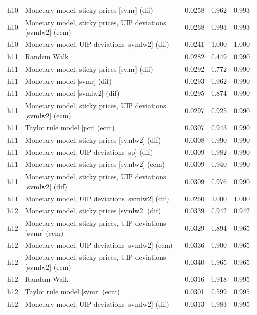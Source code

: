 \begin{ThreePartTable}
\begin{longtable}[t]{cp{5.5cm}ccc}
h10 & \raggedright Monetary model, sticky prices [svmr] (dif) & 0.0258 & 0.962 & 0.993\\
h10 & \raggedright Monetary model, sticky prices, UIP deviations [svmlw2] (ecm) & 0.0268 & 0.993 & 0.993\\
h10 & \raggedright Monetary model, UIP deviations [svmlw2] (dif) & 0.0241 & 1.000 & 1.000\\
\addlinespace
h11 & \raggedright Random Walk & 0.0282 & 0.449 & 0.990\\
h11 & \raggedright Monetary model, sticky prices [svmr] (dif) & 0.0292 & 0.772 & 0.990\\
h11 & \raggedright Monetary model [svmr] (dif) & 0.0293 & 0.962 & 0.990\\
h11 & \raggedright Monetary model [svmlw2] (dif) & 0.0295 & 0.874 & 0.990\\
h11 & \raggedright Monetary model, sticky prices, UIP deviations [svmlw2] (ecm) & 0.0297 & 0.925 & 0.990\\
h11 & \raggedright Taylor rule model [pcr] (ecm) & 0.0307 & 0.943 & 0.990\\
h11 & \raggedright Monetary model, sticky prices [svmlw2] (dif) & 0.0308 & 0.990 & 0.990\\
h11 & \raggedright Monetary model, UIP deviations [sp] (dif) & 0.0309 & 0.982 & 0.990\\
h11 & \raggedright Monetary model, sticky prices [svmlw2] (ecm) & 0.0309 & 0.940 & 0.990\\
h11 & \raggedright Monetary model, sticky prices, UIP deviations [svmlw2] (dif) & 0.0309 & 0.976 & 0.990\\
h11 & \raggedright Monetary model, UIP deviations [svmlw2] (dif) & 0.0260 & 1.000 & 1.000\\
\addlinespace
h12 & \raggedright Monetary model, sticky prices [svmlw2] (dif) & 0.0339 & 0.942 & 0.942\\
h12 & \raggedright Monetary model, sticky prices, UIP deviations [svmr] (ecm) & 0.0329 & 0.894 & 0.965\\
h12 & \raggedright Monetary model, UIP deviations [svmlw2] (ecm) & 0.0336 & 0.900 & 0.965\\
h12 & \raggedright Monetary model, sticky prices, UIP deviations [svmlw2] (ecm) & 0.0340 & 0.965 & 0.965\\
h12 & \raggedright Random Walk & 0.0316 & 0.918 & 0.995\\
h12 & \raggedright Taylor rule model [svmr] (ecm) & 0.0301 & 0.599 & 0.995\\
h12 & \raggedright Monetary model, UIP deviations [svmlw2] (dif) & 0.0313 & 0.983 & 0.995\\

\end{longtable}
\end{ThreePartTable}
